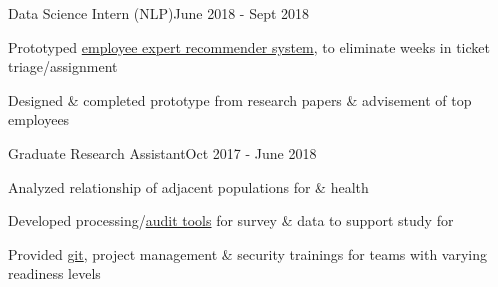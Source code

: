 \documentclass{article}
\newenvironment{**mylist}[2]{

\subsubsection*{#1\hfill#2}
  \small
  \begin{list}{}{}
    \setlength{\topsep}{0pt}
   \setlength{\itemsep}{1pt}
   \setlength{\parskip}{0pt}
   \setlength{\parsep}{0pt}}{\end{list}\normalsize}
\newcommand{\LU}[1]{\hspace{-1em}{\bf Technologies : #1}}
\def\PT{{\bf(Part Time)}\xspace}
\def\grd{Graduate\xspace}
\begin{document}
\begin{comment}
\begin{**mylist}{\censor{\href{www.thinkful.com}{Thinkful}} \PT \tabb Data Science Technical Expert}{Jan 2019 - March 2019}
\item Provided safe environment for training \& instruction in a remote-first setting
\item Advised career transitioners in mastery of professional \& data science topics
\end{**mylist}
\end{comment}

\begin{**mylist}{ \tabb Data Science Intern (NLP)}{June 2018 - Sept 2018}
\item Prototyped \href{https://www.youtube.com/watch?v=_Oa4aSXjzhs}{employee expert recommender system}, to eliminate weeks in ticket triage/assignment
\item Designed \& completed prototype from research papers \& advisement of top  employees
\end{**mylist}


\begin{**mylist}{ \tabb \grd Research Assistant}{Oct 2017 - June 2018}
\item Analyzed relationship of adjacent  populations for  \&  health
\item Developed processing/\href{https://gitlab.com/Fair_lab/HCPVaTT}{audit tools} for survey \&  data to support \href{https://abcdstudy.org/study-sites/ohsu/}{}  study for 
\item Provided \href{https://github.com/probinso/ABC}{git}, project management \& security trainings for teams with varying readiness levels
\end{**mylist}
\end{document}
